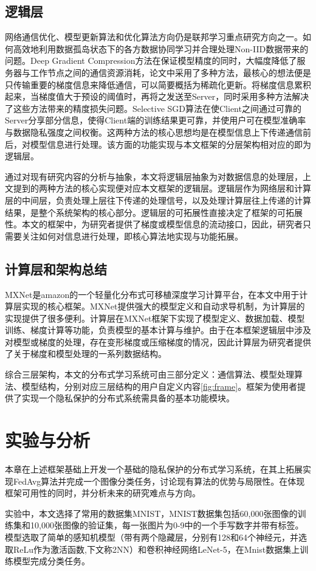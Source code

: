 \documentclass[zihao = -4,cn]{oucart}
\begin{document}
\subsection{逻辑层}
网络通信优化、模型更新算法和优化算法方向仍是联邦学习重点研究方向之一。如何高效地利用数据孤岛状态下的各方数据协同学习并合理处理Non-IID数据带来的问题。Deep Gradient Compression\cite{lin2017deep}方法在保证模型精度的同时，大幅度降低了服务器与工作节点之间的通信资源消耗，论文中采用了多种方法，最核心的想法便是只传输重要的梯度信息来降低通信，可以简要概括为稀疏化更新。将梯度信息累积起来，当梯度值大于预设的阈值时，再将之发送至Server，同时采用多种方法解决了这些方法带来的精度损失问题。Selective SGD\cite{shokri2015privacy}算法在使Client之间通过可靠的Server分享部分信息，使得Client端的训练结果更可靠，并使用户可在模型准确率与数据隐私强度之间权衡。这两种方法的核心思想均是在模型信息上下传递通信前后，对模型信息进行处理。该方面的功能实现与本文框架的分层架构相对应的即为逻辑层。\par
通过对现有研究内容的分析与抽象，本文将逻辑层抽象为对数据信息的处理层，上文提到的两种方法的核心实现便对应本文框架的逻辑层。逻辑层作为网络层和计算层的中间层，负责处理上层往下传递的处理信号，以及处理计算层往上传递的计算结果，是整个系统架构的核心部分。逻辑层的可拓展性直接决定了框架的可拓展性。本文的框架中，为研究者提供了梯度或模型信息的流动接口，因此，研究者只需要关注如何对信息进行处理，即核心算法地实现与功能拓展。\par
\subsection{计算层和架构总结}
MXNet是amazon的一个轻量化分布式可移植深度学习计算平台，在本文中用于计算层实现的核心框架。MXNet提供强大的模型定义和自动求导机制，为计算层的实现提供了很多便利。计算层在MXNet框架下实现了模型定义、数据加载、模型训练、梯度计算等功能，负责模型的基本计算与维护。由于在本框架逻辑层中涉及对模型或梯度的处理，存在变形梯度或压缩梯度的情况，因此计算层为研究者提供了关于梯度和模型处理的一系列数据结构。\par
综合三层架构，本文的分布式学习系统可由三部分定义：通信算法、模型处理算法、模型结构，分别对应三层结构的用户自定义内容\ref{fig:frame}。框架为使用者提供了实现一个隐私保护的分布式系统需具备的基本功能模块。\par

\newpage
\section{实验与分析}
本章在上述框架基础上开发一个基础的隐私保护的分布式学习系统，在其上拓展实现FedAvg算法并完成一个图像分类任务，讨论现有算法的优势与局限性。在体现框架可用性的同时，并分析未来的研究难点与方向。\par
实验中，本文选择了常用的数据集MNIST，MNIST数据集包括60,000张图像的训练集和10,000张图像的验证集，每一张图片为0-9中的一个手写数字并带有标签。模型选取了简单的感知机模型（带有两个隐藏层，分别有128和64个神经元，并选取ReLu作为激活函数,下文称2NN）和卷积神经网络LeNet-5\cite{lecun2015lenet}，在Mnist数据集上训练模型完成分类任务。\par
\end{document}

